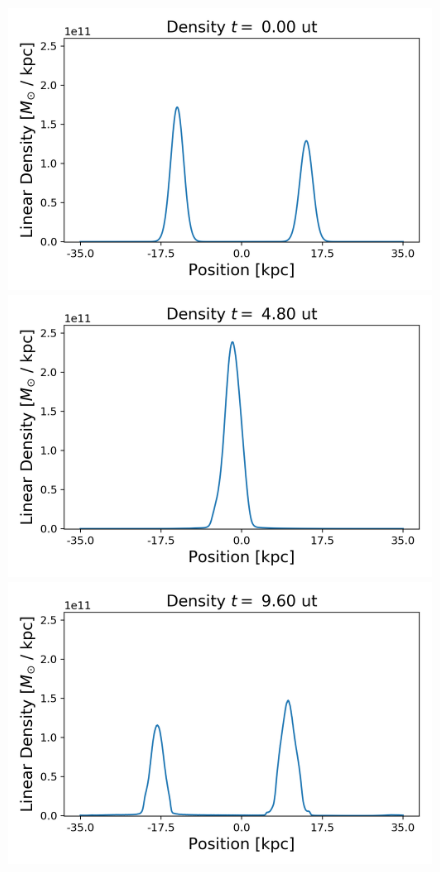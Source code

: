 \begin{figure}[h!]
    \centering
    \includegraphics[scale=0.45]{imag/bulletD0.png}
    \includegraphics[scale=0.45]{imag/bulletD12.png}
    \includegraphics[scale=0.45]{imag/bulletD24.png}

\end{figure}
